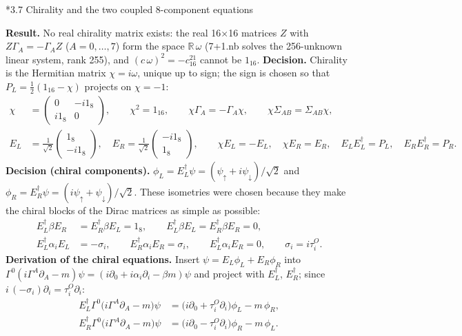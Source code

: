\documentclass[10pt,a4paper]{article}
\makeatletter
\renewcommand\subsection{\@startsection{subsection}{2}{\z@}{-3.25ex\@plus -1ex \@minus -.2ex}{1.5ex \@plus .2ex}{\normalfont\large\bfseries\raggedright}}
\makeatother
\begin{document}
\subsection*{3.7 Chirality and the two coupled 8-component equations}
\textbf{Result.} No real chirality matrix exists: the real 16×16 matrices $Z$ with $Z\Gamma_A=-\Gamma_AZ$ ($A=0,\dots,7$) form the space $\mathbb R\,\omega$ (7+1.nb solves the 256-unknown linear system, rank 255), and $(c\,\omega)^2=-c^21_{16}$ cannot be $1_{16}$. \textbf{Decision.} Chirality is the Hermitian matrix $\chi=i\omega$, unique up to sign; the sign is chosen so that $P_L=\frac12(1_{16}-\chi)$ projects on $\chi=-1$:
\begin{align*}
\chi&=\begin{pmatrix}0&-i1_8\\i1_8&0\end{pmatrix},\qquad \chi^2=1_{16},\qquad \chi\Gamma_A=-\Gamma_A\chi,\qquad \chi\Sigma_{AB}=\Sigma_{AB}\chi, \\
E_L&=\frac1{\sqrt2}\begin{pmatrix}1_8\\-i1_8\end{pmatrix},\quad E_R=\frac1{\sqrt2}\begin{pmatrix}-i1_8\\1_8\end{pmatrix},\qquad \chi E_L=-E_L,\quad \chi E_R=E_R,\quad E_LE_L^\dagger=P_L,\quad E_RE_R^\dagger=P_R .
\end{align*}
\textbf{Decision (chiral components).} $\phi_L=E_L^\dagger\psi=(\psi_\uparrow+i\psi_\downarrow)/\sqrt2$ and $\phi_R=E_R^\dagger\psi=(i\psi_\uparrow+\psi_\downarrow)/\sqrt2$. These isometries were chosen because they make the chiral blocks of the Dirac matrices as simple as possible:
\begin{align*}
E_L^\dagger\beta E_R&=E_R^\dagger\beta E_L=1_8,\qquad E_L^\dagger\beta E_L=E_R^\dagger\beta E_R=0, \\
E_L^\dagger\alpha_iE_L&=-\sigma_i,\qquad E_R^\dagger\alpha_iE_R=\sigma_i,\qquad E_L^\dagger\alpha_iE_R=0,\qquad \sigma_i=i\tau^{O}_i .
\end{align*}
\textbf{Derivation of the chiral equations.} Insert $\psi=E_L\phi_L+E_R\phi_R$ into $\Gamma^0(i\Gamma^A\partial_A-m)\psi=(i\partial_0+i\alpha_i\partial_i-\beta m)\psi$ and project with $E_L^\dagger$, $E_R^\dagger$; since $i\,(-\sigma_i)\partial_i=\tau^{O}_i\partial_i$:
\begin{align*}
E_L^\dagger\Gamma^0\big(i\Gamma^A\partial_A-m\big)\psi&=\big(i\partial_0+\tau^{O}_i\partial_i\big)\phi_L-m\,\phi_R, \\
E_R^\dagger\Gamma^0\big(i\Gamma^A\partial_A-m\big)\psi&=\big(i\partial_0-\tau^{O}_i\partial_i\big)\phi_R-m\,\phi_L .
\end{align*}
\end{document}
